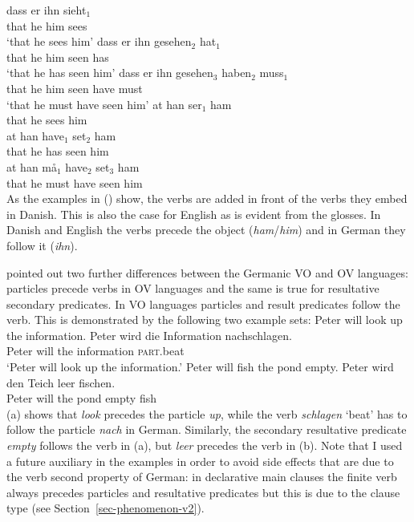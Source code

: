 \eal
\ex
\gll dass er ihn sieht$_1$\\
     that he him sees\\
\glt `that he sees him'
\ex
\gll dass er ihn gesehen$_2$ hat$_1$\\
     that he him seen        has\\
\glt `that he has seen him'
\ex
\gll dass er ihn gesehen$_3$ haben$_2$ muss$_1$\\
     that he him seen        have     must\\
\glt `that he must have seen him'
\zl
\eal
\ex
\gll at   han ser$_1$ ham\\
     that he  sees    him\\
\ex
\gll at   han have$_1$ set$_2$ ham\\
     that he  has      seen    him\\
\ex
\gll at   han må$_1$ have$_2$ set$_3$ ham\\
     that he  must   have     seen   him\\
\zl
%
As the examples in () show, the verbs are added in front of the verbs they embed in
Danish. This is also the case for English as is evident from the glosses. In Danish and English the
verbs precede the object (\emph{ham}/\emph{him}) and in German they follow it (\emph{ihn}). 

\citet[Section~15.2]{Haider2020a} pointed out two further differences between the Germanic VO and OV languages:
particles precede verbs in OV languages and the same is true for resultative secondary
predicates. In VO languages particles and result predicates follow the verb. This is demonstrated by
the following two example sets:
\eal
\ex Peter will look up the information.
\ex 
\gll Peter wird die Information nachschlagen.\\
     Peter will the information \textsc{part}.beat\\
\glt `Peter will look up the information.'
\zl
\eal
\ex Peter will fish the pond empty.
\ex 
\gll Peter wird den Teich leer fischen.\\
     Peter will the pond  empty fish\\
\zl
(a) shows that \emph{look} precedes the particle \emph{up}, while the verb \emph{schlagen}
`beat' has to follow the particle \emph{nach} in German. Similarly, the secondary resultative
predicate \emph{empty} follows the verb in (a), but \emph{leer} precedes the verb in
(b). Note that I used a future auxiliary in the examples in order to avoid side effects that
are due to the verb second property of German: in declarative main clauses the finite verb always
precedes particles and resultative predicates but this is due to the clause type (see Section~\ref{sec-phenomenon-v2}).

